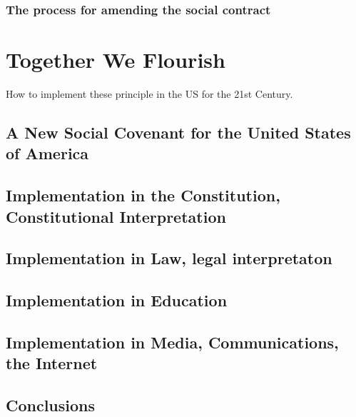 \documentclass[
]{book}
\begin{document}
\hypertarget{the-process-for-amending-the-social-contract}{%
\section{The process for amending the social contract}\label{the-process-for-amending-the-social-contract}}

\hypertarget{part-together-we-flourish}{%
\part{Together We Flourish}\label{part-together-we-flourish}}

How to implement these principle in the US for the 21st Century.

\hypertarget{a-new-social-covenant-for-the-united-states-of-america}{%
\chapter{A New Social Covenant for the United States of America}\label{a-new-social-covenant-for-the-united-states-of-america}}

\hypertarget{implementation-in-the-constitution-constitutional-interpretation}{%
\chapter{Implementation in the Constitution, Constitutional Interpretation}\label{implementation-in-the-constitution-constitutional-interpretation}}

\hypertarget{implementation-in-law-legal-interpretaton}{%
\chapter{Implementation in Law, legal interpretaton}\label{implementation-in-law-legal-interpretaton}}

\hypertarget{implementation-in-education}{%
\chapter{Implementation in Education}\label{implementation-in-education}}

\hypertarget{implementation-in-media-communications-the-internet}{%
\chapter{Implementation in Media, Communications, the Internet}\label{implementation-in-media-communications-the-internet}}

\hypertarget{conclusions}{%
\chapter{Conclusions}\label{conclusions}}
\end{document}
